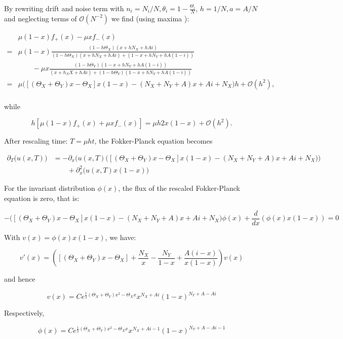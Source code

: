 By rewriting drift and noise term with $n_i = N_i/N, \theta_i = 1- \frac{\Theta_i}{N}$, $h = 1/N, a = A/N$ and neglecting terms of $\mathcal{O}(N^{-2})$ we find (using maxima %
):

\begin{align*}
& \mu(1-x)f_+(x) - \mu xf_-(x)\\
= & \mu(1-x) \frac{(1-h\Theta_X) (x+ hN_X+ hAi)}{(1-h\Theta_X) (x + hN_X + hAi) + (1-x + hN_Y + hA(1-i))}\\
&\qquad - \mu x \frac{(1-h\Theta_Y)(1-x+hN_Y+hA(1-i))}{(x+h_NX+hAi) + (1-h\Theta_Y)(1-x+hN_Y+hA(1-i))}\\
=& \mu\Big(\left[\left(\Theta_X + \Theta_Y\right)x - \Theta_X\right]x\left(1-x\right)-\left(N_X + N_Y + A\right)x + Ai + N_X\Big)h+ \mathcal{O}(h^2),\\
\end{align*}

while 

\begin{equation*}
h\left[\mu(1-x)f_+(x) + \mu xf_-(x)\right] = \mu h 2x(1-x) + \mathcal{O}(h^2).
\end{equation*}

After rescaling time: $T = \mu h t$, the Fokker-Planck equation becomes

\begin{align*}
\partial_T \big(u\left(x, T\right)\big) &= -\partial_x\Bigg(u(x,T)\Big(\left[\left(\Theta_X + \Theta_Y\right)x - \Theta_X\right]x\left(1-x\right)-\left(N_X + N_Y + A\right)x + Ai + N_X\Big)\Bigg)\\
&\qquad + \partial^2_x\big(u(x,T)x(1-x)\big)
\end{align*}

For the invariant distribution $\phi(x)$, the flux of the rescaled Fokker-Planck equation is zero, that is:

\begin{equation*}
-\Big(\left[\left(\Theta_X + \Theta_Y\right)x - \Theta_X\right]x\left(1-x\right)-\left(N_X + N_Y + A\right)x + Ai + N_X\Big)\phi(x) + \frac{d}{dx}\left(\phi(x)x\left(1-x\right)\right)= 0
\end{equation*}

With $v(x) = \phi(x)x\left(1-x\right)$, we have:

\begin{equation*}
v'(x) = \left(\left[\left(\Theta_X + \Theta_Y\right)x - \Theta_X\right] + \frac{N_X}{x} - \frac{N_Y}{1-x} + \frac{A(i-x)}{x(1-x)}\right)v(x)
\end{equation*}

and hence

\begin{equation*}
v(x) = Ce^{\frac{1}{2}\left(\Theta_X + \Theta_Y\right)x^2 - \Theta_X x}x^{N_X + Ai}\left(1-x\right)^{N_Y+A - Ai}
\end{equation*}

Respectively,

\begin{equation*}
\phi(x) = Ce^{\frac{1}{2}\left(\Theta_X + \Theta_Y\right)x^2 - \Theta_X x}x^{N_X + Ai - 1}\left(1-x\right)^{N_Y+A - Ai - 1}
\end{equation*}